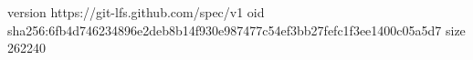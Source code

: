 version https://git-lfs.github.com/spec/v1
oid sha256:6fb4d746234896e2deb8b14f930e987477c54ef3bb27fefc1f3ee1400c05a5d7
size 262240

